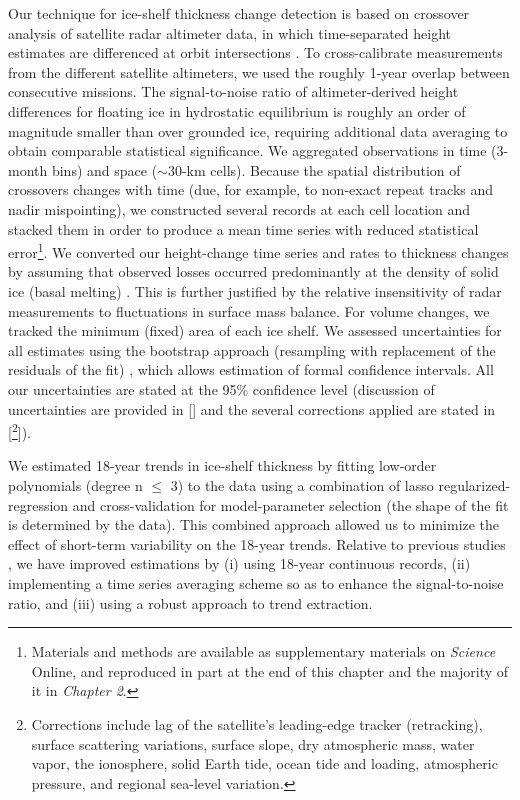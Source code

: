 Our technique for ice-shelf thickness change detection is based on crossover
analysis of satellite radar altimeter data, in which time-separated height 
estimates are differenced at orbit intersections \parencite{Zwally2005, 
Davis2004, Wingham2009}. To cross-calibrate measurements from the different 
satellite altimeters, we used the roughly 1-year overlap between consecutive
missions. The signal-to-noise ratio of altimeter-derived height differences for
floating ice in hydrostatic equilibrium is roughly an order of magnitude 
smaller than over grounded ice, requiring additional data averaging to obtain
comparable statistical significance. We aggregated observations in time 
(3-month bins) and space ($\sim$30-km cells). Because the spatial distribution
of crossovers changes with time (due, for example, to non-exact repeat tracks
and nadir mispointing), we constructed several records at each cell location
and stacked them in order to produce a mean time series with reduced
statistical error\footnote{\label{SM}Materials and methods are available as 
supplementary materials on {\it Science} Online, and reproduced in part at the end of
this chapter and the majority of it in {\sl Chapter 2}.}. We converted our height-change time series and rates to
thickness changes by assuming that observed losses occurred predominantly at
the density of solid ice (basal melting) \parencite{Shepherd2010,
Pritchard2012, Wingham2009}. This is further justified by the relative
insensitivity of radar measurements to fluctuations in surface mass 
balance\footnotemark[1]. For volume changes, we tracked the minimum (fixed) area of
each ice shelf\footnotemark[1]. We assessed uncertainties for all estimates using
the bootstrap approach (resampling with replacement of the residuals of the
fit) \parencite{Efron1993}, which allows estimation of formal confidence
intervals. All our uncertainties are stated at the 95\% confidence level 
(discussion of uncertainties are provided in [\footnotemark[1]] and the several
corrections applied are stated in [\footnote{Corrections include lag of the
satellite's leading-edge tracker (retracking), surface scattering variations,
surface slope, dry atmospheric mass, water vapor, the ionosphere, solid Earth
tide, ocean tide and loading, atmospheric pressure, and regional sea-level
variation\footnotemark[1].}]).

We estimated 18-year trends in ice-shelf thickness by fitting low-order 
polynomials (degree n $\leqslant$ 3) to the data using a combination of lasso
regularized-regression \parencite{Tibshirani1996} and cross-validation for
model-parameter selection (the shape of the fit is determined by the data).
This combined approach allowed us to minimize the effect of short-term
variability on the 18-year trends. Relative to previous studies
\parencite{Shepherd2010, Pritchard2012, Zwally2005, Fricker2012}, we have
improved estimations by (i) using 18-year continuous records, (ii) implementing
a time series averaging scheme so as to enhance the signal-to-noise ratio, and
(iii) using a robust approach to trend extraction.

